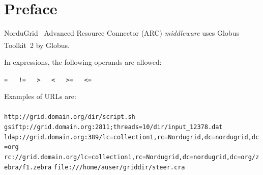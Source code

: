 \documentclass{book}
\newcommand{\GT}{Globus Toolkit\textsuperscript{\textregistered}}
\begin{document}
\tableofcontents                          %
\newpage
\chapter{Preface}
\label{sec:intro}

NorduGrid~\cite{nordugrid} Advanced Resource Connector (ARC)
\textit{middleware} uses \GT~2 by Globus.

In expressions, the following operands are allowed:
\begin{shaded}
  \verb#=   !=   >   <   >=   <=#
\end{shaded}

\begin{framed}
  Examples of URLs are:\\
  \\
  \verb#http://grid.domain.org/dir/script.sh#\\
  \verb#gsiftp://grid.domain.org:2811;threads=10/dir/input_12378.dat#\\
  \verb#ldap://grid.domain.org:389/lc=collection1,rc=Nordugrid,dc=nordugrid,dc=org#\\
  \verb#rc://grid.domain.org/lc=collection1,rc=Nordugrid,dc=nordugrid,dc=org/zebra/f1.zebra#
  \verb#file:///home/auser/griddir/steer.cra#\\
\end{framed}


\begin{figure}[ht]
\end{figure}



\end{document}
